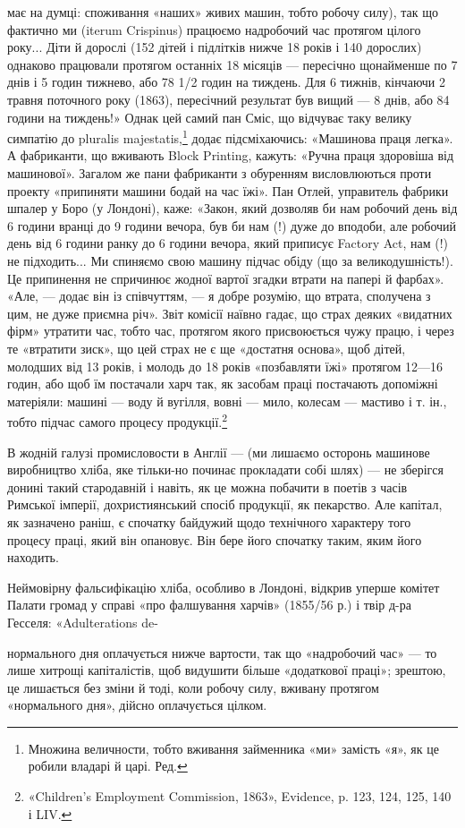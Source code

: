 має на думці: споживання «наших» живих машин, тобто робочу
силу), так що фактично ми (iterum Crispinus) працюємо надробочий
час протягом цілого року... Діти й дорослі (152 дітей і
підлітків нижче 18 років і 140 дорослих) однаково працювали
протягом останніх 18 місяців — пересічно щонайменше по 7 днів
і 5 годин тижнево, або 78 1/2 годин на тиждень. Для 6 тижнів,
кінчаючи 2 травня поточного року (1863), пересічний результат
був вищий — 8 днів, або 84 години на тиждень!» Однак  цей самий
пан Сміс, що відчуває таку велику симпатію до pluralis majestatis,\footnote*{
Множина величности, тобто вживання займенника «ми» замість
«я», як це робили владарі й царі. Ред.
}
додає підсміхаючись: «Машинова праця легка». А фабриканти,
що вживають Block Printing, кажуть: «Ручна праця
здоровіша від машинової». Загалом же пани фабриканти з обуренням
висловлюються проти проекту «припиняти машини бодай
на час їжі». Пан Отлей, управитель фабрики шпалер у Боро
(у Лондоні), каже: «Закон, який дозволяв би нам робочий день
від 6 години вранці до 9 години вечора, був би нам (!) дуже до вподоби,
але робочий день від 6 години ранку до 6 години вечора,
який приписує Factory Act, нам (!) не підходить... Ми спиняємо
свою машину підчас обіду (що за великодушність!). Це припинення
не спричинює жодної вартої згадки втрати на папері й фарбах».
«Але, — додає він із співчуттям, — я добре розумію, що втрата,
сполучена з цим, не дуже приємна річ». Звіт комісії наївно гадає,
що страх деяких «видатних фірм» утратити час, тобто час, протягом
якого присвоюється чужу працю, і через те «втратити зиск»,
що цей страх не є ще «достатня основа», щоб дітей, молодших
від 13 років, і молодь до 18 років «позбавляти їжі» протягом
12—16 годин, або щоб їм постачали харч так, як засобам праці
постачають допоміжні матеріяли: машині — воду й вугілля,
вовні — мило, колесам — мастиво і т. ін., тобто підчас самого
процесу продукції.\footnote{
«Children’s Employment Commission, 1863», Evidence, p. 123,
124, 125, 140 і LIV.
}

В жодній галузі промисловости в Англії — (ми лишаємо осторонь
машинове виробництво хліба, яке тільки-но починає прокладати
собі шлях) — не зберігся донині такий стародавній
і навіть, як це можна побачити в поетів з часів Римської імперії,
дохристиянський спосіб продукції, як пекарство. Але капітал,
як зазначено раніш, є спочатку байдужий щодо технічного характеру
того процесу праці, який він опановує. Він бере його
спочатку таким, яким його находить.

Неймовірну фальсифікацію хліба, особливо в Лондоні, відкрив
уперше комітет Палати громад у справі «про фалшування
харчів» (1855/56 р.) і твір д-ра Гесселя: «Adulterations de-

нормального дня оплачується нижче вартости, так що «надробочий
час» — то лише хитрощі капіталістів, щоб видушити більше «додаткової
праці»; зрештою, це лишається без зміни й тоді, коли робочу силу, вживану
протягом «нормального дня», дійсно оплачується цілком.